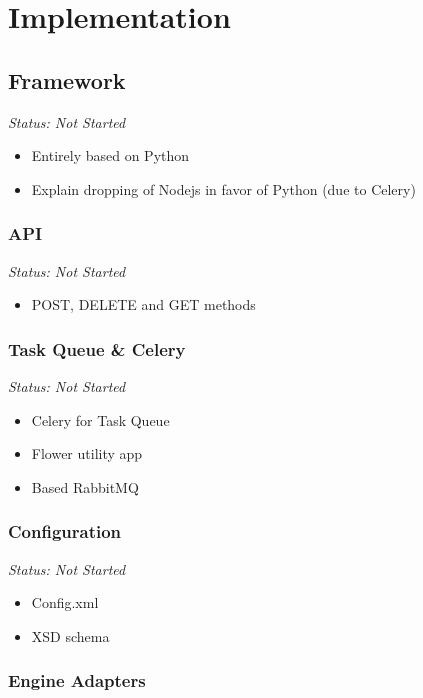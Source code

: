 \chapter{Implementation}

\section{Framework}

\emph{Status: Not Started}

\begin{itemize}
\item Entirely based on Python
\item Explain dropping of Nodejs in favor of Python (due to Celery)
\end{itemize}

\subsection{API}

\emph{Status: Not Started}

\begin{itemize}
\item POST, DELETE and GET methods
\end{itemize}

\subsection{Task Queue \& Celery}

\emph{Status: Not Started}

\begin{itemize}
\item Celery for Task Queue
\item Flower utility app
\item Based RabbitMQ
\end{itemize}

\subsection{Configuration}

\emph{Status: Not Started}

\begin{itemize}
\item Config.xml
\item XSD schema
\end{itemize}

\subsection{Engine Adapters}

